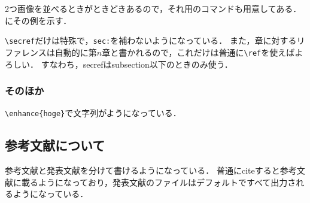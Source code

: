 2つ画像を並べるときがときどきあるので，それ用のコマンドも用意してある．
にその例を示す．


\verb|\secref|だけは特殊で，\verb|sec:|を補わないようになっている．
また，章に対するリファレンスは自動的に第$n$章と書かれるので，これだけは普通に\verb|\ref|を使えばよろしい．
すなわち，secrefはsubsection以下のときのみ使う．

\subsubsection{そのほか}

\verb|\enhance{hoge}|で文字列がようになっている．

\subsection{参考文献について}

参考文献と発表文献を分けて書けるようになっている．
普通にciteすると参考文献に載るようになっており，発表文献のファイルはデフォルトですべて出力されるようになっている．
